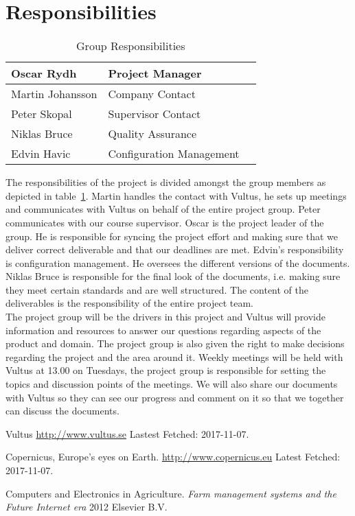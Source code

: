 \documentclass[a4paper]{article}
\begin{document}
\section{Responsibilities}
\begin{table}[h!]
\centering
\caption{Group Responsibilities}
\label{tab:reponsibilities}
\begin{tabular}{|l|l|l|}
\hline
Oscar Rydh       & Project Manager 			\\ \hline
Martin Johansson & Company Contact          \\ \hline
Peter Skopal     & Supervisor Contact       \\ \hline
Niklas Bruce     & Quality Assurance        \\ \hline
Edvin Havic      & Configuration Management \\ \hline
\end{tabular}
\end{table}
The responsibilities of the project is divided amongst the group members as depicted in table~\ref{tab:reponsibilities}. Martin handles the contact with Vultus, he sets up meetings and communicates with Vultus on behalf of the entire project group. Peter communicates with our course supervisor. Oscar is the project leader of the group. He is responsible for syncing the project effort and making sure that we deliver correct deliverable and that our deadlines are met. Edvin's responsibility is configuration management. He oversees the different versions of the documents. Niklas Bruce is responsible for the final look of the documents, i.e. making sure they meet certain standards and are well structured. The content of the deliverables is the responsibility of the entire project team. 
\\
The project group will be the drivers in this project and Vultus will provide information and resources to answer our questions regarding aspects of the product and domain. The project group is also given the right to make decisions regarding the project and the area around it. Weekly meetings will be held with Vultus at 13.00 on Tuesdays, the project group is responsible for setting the topics and discussion points of the meetings. We will also share our documents with Vultus so they can see our progress and comment on it so that we together can discuss the documents. 

\begin{thebibliography}{}

Vultus \url{http://www.vultus.se} Lastest Fetched: 2017-11-07.

Copernicus, Europe's eyes on Earth. \url{http://www.copernicus.eu} Latest Fetched: 2017-11-07.

Computers and Electronics in Agriculture. \textit{Farm management systems and the Future Internet era} 2012 Elsevier B.V.

\end{thebibliography}
\end{document}
